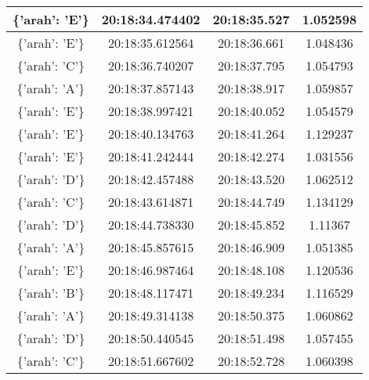 \begin{longtable}{|ccc|c|}
    \multicolumn{1}{|c|}{\{'arah': 'E'\}} & \multicolumn{1}{c|}{20:18:34.474402} & 20:18:35.527       & 1.052598    \\ \hline
    \multicolumn{1}{|c|}{\{'arah': 'E'\}} & \multicolumn{1}{c|}{20:18:35.612564} & 20:18:36.661       & 1.048436    \\ \hline
    \multicolumn{1}{|c|}{\{'arah': 'C'\}} & \multicolumn{1}{c|}{20:18:36.740207} & 20:18:37.795       & 1.054793    \\ \hline
    \multicolumn{1}{|c|}{\{'arah': 'A'\}} & \multicolumn{1}{c|}{20:18:37.857143} & 20:18:38.917       & 1.059857    \\ \hline
    \multicolumn{1}{|c|}{\{'arah': 'E'\}} & \multicolumn{1}{c|}{20:18:38.997421} & 20:18:40.052       & 1.054579    \\ \hline
    \multicolumn{1}{|c|}{\{'arah': 'E'\}} & \multicolumn{1}{c|}{20:18:40.134763} & 20:18:41.264       & 1.129237    \\ \hline
    \multicolumn{1}{|c|}{\{'arah': 'E'\}} & \multicolumn{1}{c|}{20:18:41.242444} & 20:18:42.274       & 1.031556    \\ \hline
    \multicolumn{1}{|c|}{\{'arah': 'D'\}} & \multicolumn{1}{c|}{20:18:42.457488} & 20:18:43.520       & 1.062512    \\ \hline
    \multicolumn{1}{|c|}{\{'arah': 'C'\}} & \multicolumn{1}{c|}{20:18:43.614871} & 20:18:44.749       & 1.134129    \\ \hline
    \multicolumn{1}{|c|}{\{'arah': 'D'\}} & \multicolumn{1}{c|}{20:18:44.738330} & 20:18:45.852       & 1.11367     \\ \hline
    \multicolumn{1}{|c|}{\{'arah': 'A'\}} & \multicolumn{1}{c|}{20:18:45.857615} & 20:18:46.909       & 1.051385    \\ \hline
    \multicolumn{1}{|c|}{\{'arah': 'E'\}} & \multicolumn{1}{c|}{20:18:46.987464} & 20:18:48.108       & 1.120536    \\ \hline
    \multicolumn{1}{|c|}{\{'arah': 'B'\}} & \multicolumn{1}{c|}{20:18:48.117471} & 20:18:49.234       & 1.116529    \\ \hline
    \multicolumn{1}{|c|}{\{'arah': 'A'\}} & \multicolumn{1}{c|}{20:18:49.314138} & 20:18:50.375       & 1.060862    \\ \hline
    \multicolumn{1}{|c|}{\{'arah': 'D'\}} & \multicolumn{1}{c|}{20:18:50.440545} & 20:18:51.498       & 1.057455    \\ \hline
    \multicolumn{1}{|c|}{\{'arah': 'C'\}} & \multicolumn{1}{c|}{20:18:51.667602} & 20:18:52.728       & 1.060398    \\ \hline

\end{longtable}
